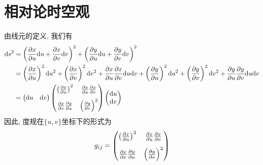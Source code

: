 \chapter{相对论时空观}
\begin{solution}
    由线元的定义, 我们有
    \begin{align*}
        \dd s^2 &= \left(\frac{\partial x}{\partial u} \dd u + \frac{\partial x}{\partial v} \dd v\right)^2 + \left(\frac{\partial y}{\partial u} \dd u + \frac{\partial y}{\partial v} \dd v\right)^2 \\
        &= \left(\frac{\partial x}{\partial u}\right)^2 \dd u^2 + \left(\frac{\partial x}{\partial v}\right)^2 \dd v^2 + \frac{\partial x}{\partial u} \frac{\partial x}{\partial v} \dd u \dd v + \left(\frac{\partial y}{\partial u}\right)^2 \dd u^2 + \left(\frac{\partial y}{\partial v}\right)^2 \dd v^2 + \frac{\partial y}{\partial u} \frac{\partial y}{\partial v} \dd u \dd v \\
        &= \begin{pmatrix}
            \dd u & \dd v
        \end{pmatrix} \begin{pmatrix}
            \left(\frac{\partial x}{\partial u}\right)^2 & \frac{\partial x}{\partial u} \frac{\partial x}{\partial v} \\[0.8em]
            \frac{\partial x}{\partial v} \frac{\partial y}{\partial u} & \left(\frac{\partial y}{\partial v}\right)^2
        \end{pmatrix} \begin{pmatrix}
            \dd u \\ \dd v
        \end{pmatrix}
    \end{align*}
    因此, 度规在$\{u,v\}$坐标下的形式为
    \[
        g_{ij} = \begin{pmatrix}
            \left(\frac{\partial x}{\partial u}\right)^2 & \frac{\partial x}{\partial u} \frac{\partial x}{\partial v} \\[0.8em]
            \frac{\partial x}{\partial v} \frac{\partial y}{\partial u} & \left(\frac{\partial y}{\partial v}\right)^2
        \end{pmatrix}
    \]
\end{solution}

